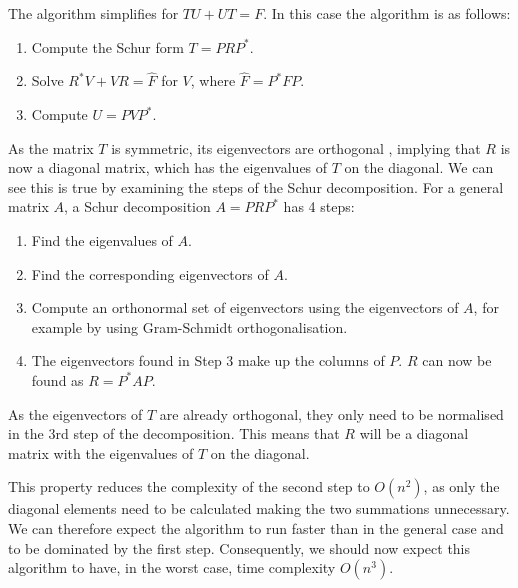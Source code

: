 \documentclass[11pt]{article}
\numberwithin{equation}{section}
\begin{document}
The algorithm simplifies for $TU+UT=F$. In this case the algorithm is as follows:
\begin{enumerate}
\item Compute the Schur form $T=PRP^*$.
\item Solve $R^*V + VR = \hat{F}$ for $V$, where $\hat{F} =  P^*FP$.
\item Compute $U=PVP^*$.
\end{enumerate}
As the matrix $T$ is symmetric, its eigenvectors are orthogonal \cite{Quandt}, implying that $R$ is now a diagonal matrix, which has the eigenvalues of $T$ on the diagonal. We can see this is true by examining the steps of the Schur decomposition. For a general matrix $A$, a Schur decomposition $A=PRP^*$ has 4 steps:
\begin{enumerate}
\item Find the eigenvalues of $A$.
\item Find the corresponding eigenvectors of $A$.
\item Compute an orthonormal set of eigenvectors using the eigenvectors of $A$, for example by using Gram-Schmidt orthogonalisation.
\item The eigenvectors found in Step 3 make up the columns of $P$. $R$ can now be found as $R=P^*AP$. 
\end{enumerate}
As the eigenvectors of $T$ are already orthogonal, they only need to be normalised in the 3rd step of the decomposition. This means that $R$ will be a diagonal matrix with the eigenvalues of $T$ on the diagonal.

This property reduces the complexity of the second step to $O(n^2)$, as only the diagonal elements need to be calculated making the two summations unnecessary. We can therefore expect the algorithm to run faster than in the general case and to be dominated by the first step. Consequently, we should now expect this algorithm to have, in the worst case, time complexity $O(n^3)$.
\end{document}
